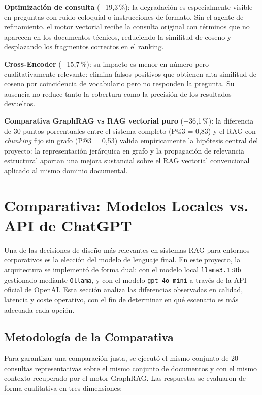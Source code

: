 \textbf{Optimización de consulta} ($-$19,3\,\%): la degradación es especialmente visible en preguntas con ruido coloquial o instrucciones de formato. Sin el agente de refinamiento, el motor vectorial recibe la consulta original con términos que no aparecen en los documentos técnicos, reduciendo la similitud de coseno y desplazando los fragmentos correctos en el ranking.

\textbf{Cross-Encoder} ($-$15,7\,\%): su impacto es menor en número pero cualitativamente relevante: elimina falsos positivos que obtienen alta similitud de coseno por coincidencia de vocabulario pero no responden la pregunta. Su ausencia no reduce tanto la cobertura como la precisión de los resultados devueltos.

\textbf{Comparativa GraphRAG vs RAG vectorial puro} ($-$36,1\,\%): la diferencia de 30 puntos porcentuales entre el sistema completo (P@3 = 0,83) y el RAG con \textit{chunking} fijo sin grafo (P@3 = 0,53) valida empíricamente la hipótesis central del proyecto: la representación jerárquica en grafo y la propagación de relevancia estructural aportan una mejora sustancial sobre el RAG vectorial convencional aplicado al mismo dominio documental.

\newpage
\section{Comparativa: Modelos Locales vs. API de ChatGPT}
\label{sec:comparativa_modelos}

Una de las decisiones de diseño más relevantes en sistemas RAG para entornos corporativos es la elección del modelo de lenguaje final. En este proyecto, la arquitectura se implementó de forma dual: con el modelo local \texttt{llama3.1:8b} gestionado mediante \texttt{Ollama}, y con el modelo \texttt{gpt-4o-mini} a través de la API oficial de OpenAI. Esta sección analiza las diferencias observadas en calidad, latencia y coste operativo, con el fin de determinar en qué escenario es más adecuada cada opción.

\subsection{Metodología de la Comparativa}

Para garantizar una comparación justa, se ejecutó el mismo conjunto de 20 consultas representativas sobre el mismo conjunto de documentos y con el mismo contexto recuperado por el motor GraphRAG. Las respuestas se evaluaron de forma cualitativa en tres dimensiones:

